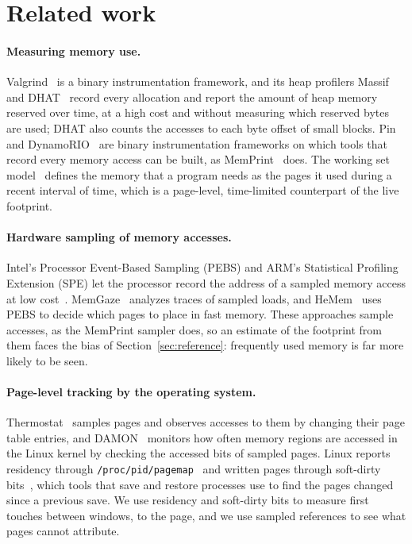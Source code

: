 \documentclass[11pt]{article}
\newcommand{\memprint}{MemPrint}
\newcommand{\secref}[1]{Section~\ref{#1}}
\begin{document}
\section{Related work}
\label{sec:related}

\paragraph{Measuring memory use.}
Valgrind~\cite{Nethercote2007Valgrind} is a binary instrumentation framework, and its heap profilers Massif~\cite{ValgrindMassif} and DHAT~\cite{dhat} record every allocation and report the amount of heap memory reserved over time, at a high cost and without measuring which reserved bytes are used; DHAT also counts the accesses to each byte offset of small blocks. Pin~\cite{Luk2005Pin} and DynamoRIO~\cite{bruening2003dynamorio} are binary instrumentation frameworks on which tools that record every memory access can be built, as \memprint{}~\cite{memprint} does. The working set model~\cite{denning1968} defines the memory that a program needs as the pages it used during a recent interval of time, which is a page-level, time-limited counterpart of the live footprint.

\paragraph{Hardware sampling of memory accesses.}
Intel's Processor Event-Based Sampling (PEBS) and ARM's Statistical Profiling Extension (SPE) let the processor record the address of a sampled memory access at low cost~\cite{roca_nonell2020pebs,miksits2024arm_memprof}. MemGaze~\cite{Xu2020MemGaze} analyzes traces of sampled loads, and HeMem~\cite{raybuck2021hemem} uses PEBS to decide which pages to place in fast memory. These approaches sample accesses, as the \memprint{} sampler does, so an estimate of the footprint from them faces the bias of \secref{sec:reference}: frequently used memory is far more likely to be seen.

\paragraph{Page-level tracking by the operating system.}
Thermostat~\cite{agarwal2017thermostat} samples pages and observes accesses to them by changing their page table entries, and DAMON~\cite{park2019damon} monitors how often memory regions are accessed in the Linux kernel by checking the accessed bits of sampled pages. Linux reports residency through \texttt{/proc/pid/pagemap}~\cite{pagemap} and written pages through soft-dirty bits~\cite{softdirty}, which tools that save and restore processes use to find the pages changed since a previous save. We use residency and soft-dirty bits to measure first touches between windows, to the page, and we use sampled references to see what pages cannot attribute.
\end{document}
